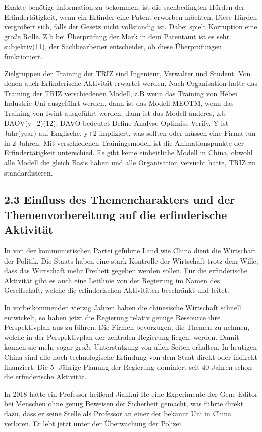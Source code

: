 \documentclass[11pt,a4paper]{article}
\begin{document}
Exakte benötige Information zu bekommen, ist die sachbedingten Hürden der
Erfindertätigkeit, wenn ein Erfinder eine Patent erworben möchten. Diese
Hürden vergrößert sich, falls der Gesetz nicht vollständig ist. Dabei spielt
Korruption eine große Rolle. Z.b bei Überprüfung der Mark in dem Patentamt ist
es sehr subjektiv(11), der Sachbearbeiter entscheidet, ob diese Überprüfungen
funktioniert.

Zielgruppen der Training der TRIZ sind Ingenieur, Verwalter und Student. Von
denen auch Erfinderische Aktivität erwartet werden. Nach Organisation hatte
das Training der TRIZ verschiedenen Modell, z.B wenn das Training von Hebei
Industrie Uni ausgeführt werden, dann ist das Modell MEOTM, wenn das Training
von Iwint ausgeführt werden, dann ist das Modell anderes, z.b DAOV(y+2)(12),
DAVO bedeutet Define Analyse Optimise Verify.  Y ist Jahr(year) auf Englische,
y+2 impliziert, was sollten oder müssen eine Firma tun in 2 Jahren. Mit
verschiedenen Trainingsmodell ist die Animationspunkte der Erfindertätigkeit
unterschied. Es gibt keine einheitliche Modell in China, obwohl alle Modell
die gleich Basis haben und alle Organisation versucht hatte, TRIZ zu
standardisieren.

\subsection{2.3 Einfluss des Themencharakters und der Themenvorbereitung auf
  die erfinderische Aktivität} 

In von der kommunistischen Partei geführte Land wie China dient die Wirtschaft
der Politik. Die Staats haben eine stark Kontrolle der Wirtschaft trotz dem
Wille, dass das Wirtschaft mehr Freiheit gegeben werden sollen. Für die
erfinderische Aktivität gibt es auch eine Leitlinie von der Regierung im Namen
des Gesellschaft, welche die erfinderischen Aktivitäten beschränkt und leitet.

In vorbeikommenden vierzig Jahren haben die chinesische Wirtschaft schnell
entwickelt, so haben jetzt die Regierung relativ genüge Ressource ihre
Perspektivplan aus zu führen. Die Firmen bevorzugen, die Themen zu nehmen,
welche in der Perspektivplan der zentralen Regierung liegen, werden. Damit
können sie mehr sogar große Unterstützung von allen Seiten erhalten. In
heutigen China sind alle hoch technologische Erfindung von dem Staat direkt
oder indirekt finanziert. Die 5- Jährige Planung der Regierung dominiert seit
40 Jahren schon die erfinderische Aktivität.

In 2018 hatte ein Professor heißend Jiankui He eine Experimente der
Gene-Editor bei Menschen ohne genug Beweisen der Sicherheit gemacht, was
führte direkt dazu, dass er seine Stelle als Professor an einer der bekannt
Uni in China verloren. Er lebt jetzt unter der Überwachung der Polizei.
\end{document}
